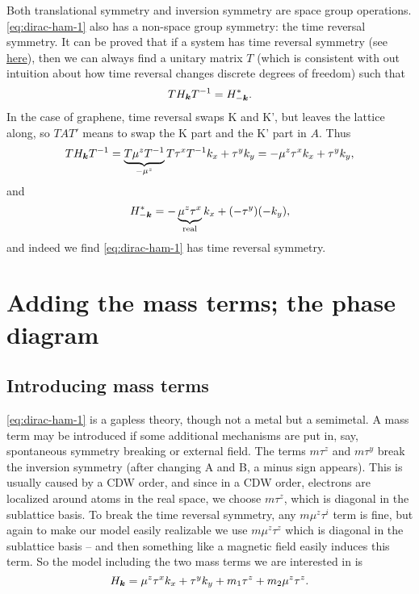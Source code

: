 \documentclass[hyperref, a4paper]{article}
\begin{document}
Both translational symmetry and inversion symmetry are space group operations.
\eqref{eq:dirac-ham-1} also has a non-space group symmetry:
the time reversal symmetry.
It can be proved that if a system has time reversal symmetry 
(see \href{../group-and-topology-yang-qi/2022-4-12.pdf}{here}),
then we can always find a unitary matrix $T$ 
(which is consistent with out intuition about how time reversal changes discrete degrees of freedom)
such that 
\begin{equation}
    T H_{\vb*{k}} T^{-1} = H_{-\vb*{k}}^*.
\end{equation}
In the case of graphene,
time reversal swaps K and K', 
but leaves the lattice along,
so $T A T'$ means to swap the K part and the K' part in $A$.
Thus 
\[
    T H_{\vb*{k}} T^{-1}
    = \underbrace{T \mu^z T^{-1}}_{- \mu^z} T \tau^x T^{-1} k_x + \tau^y k_y
    = - \mu^z \tau^x k_x + \tau^y k_y,
\]
and 
\[
    H_{- \vb*{k}}^* = - \underbrace{\mu^z \tau^x}_{\text{real}} k_x + (-\tau^y) (-k_y),
\]
and indeed we find \eqref{eq:dirac-ham-1} has time reversal symmetry.

\section{Adding the mass terms; the phase diagram}

\subsection{Introducing mass terms}

\eqref{eq:dirac-ham-1} is a gapless theory,
though not a metal but a semimetal.
A mass term may be introduced if some additional mechanisms are put in,
say, spontaneous symmetry breaking or external field.
The terms $m \tau^z$ and $m \tau^y$ break the inversion symmetry 
(after changing A and B, a minus sign appears).
This is usually caused by a CDW order,
and since in a CDW order, electrons are localized around atoms in the real space,
we choose $m \tau^z$,
which is diagonal in the sublattice basis.
To break the time reversal symmetry, any $m \mu^z \tau^i$ term is fine,
but again to make our model easily realizable 
we use $m \mu^z \tau^z$ which is diagonal in the sublattice basis
-- and then something like a magnetic field easily induces this term.
So the model including the two mass terms we are interested in is 
\begin{equation}
    H_{\vb*{k}} = \mu^z \tau^x k_x + \tau^y k_y + m_1 \tau^z + m_2 \mu^z \tau^z.
    \label{eq:model-ham}
\end{equation}
\end{document}
